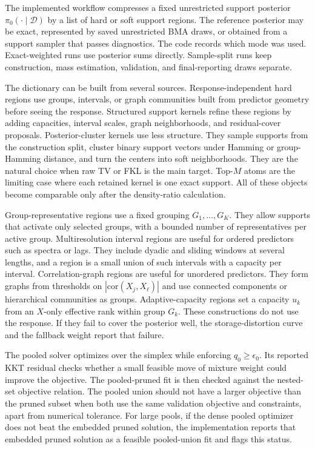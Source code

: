 \documentclass[twoside,11pt]{article}
\newcommand{\D}{\mathcal{D}}
\begin{document}
The implemented workflow compresses a fixed unrestricted support posterior \(\pi_0(\cdot\mid\D)\) by a list of hard or soft support regions. The reference posterior may be exact, represented by saved unrestricted BMA draws, or obtained from a support sampler that passes diagnostics. The code records which mode was used. Exact-weighted runs use posterior sums directly. Sample-split runs keep construction, mass estimation, validation, and final-reporting draws separate.

The dictionary can be built from several sources. Response-independent hard regions use groups, intervals, or graph communities built from predictor geometry before seeing the response. Structured support kernels refine these regions by adding capacities, interval scales, graph neighborhoods, and residual-cover proposals. Posterior-cluster kernels use less structure. They sample supports from the construction split, cluster binary support vectors under Hamming or group-Hamming distance, and turn the centers into soft neighborhoods. They are the natural choice when raw TV or FKL is the main target. Top-\(M\) atoms are the limiting case where each retained kernel is one exact support. All of these objects become comparable only after the density-ratio calculation.

Group-representative regions use a fixed grouping \(G_1,\dots,G_K\). They allow supports that activate only selected groups, with a bounded number of representatives per active group. Multiresolution interval regions are useful for ordered predictors such as spectra or lags. They include dyadic and sliding windows at several lengths, and a region is a small union of such intervals with a capacity per interval. Correlation-graph regions are useful for unordered predictors. They form graphs from thresholds on \(|\mathrm{cor}(X_j,X_\ell)|\) and use connected components or hierarchical communities as groups. Adaptive-capacity regions set a capacity \(u_k\) from an \(X\)-only effective rank within group \(G_k\). These constructions do not use the response. If they fail to cover the posterior well, the storage-distortion curve and the fallback weight report that failure.

The pooled solver optimizes over the simplex while enforcing \(q_0\ge\epsilon_0\). Its reported KKT residual checks whether a small feasible move of mixture weight could improve the objective. The pooled-pruned fit is then checked against the nested-set objective relation. The pooled union should not have a larger objective than the pruned subset when both use the same validation objective and constraints, apart from numerical tolerance. For large pools, if the dense pooled optimizer does not beat the embedded pruned solution, the implementation reports that embedded pruned solution as a feasible pooled-union fit and flags this status.
\end{document}
